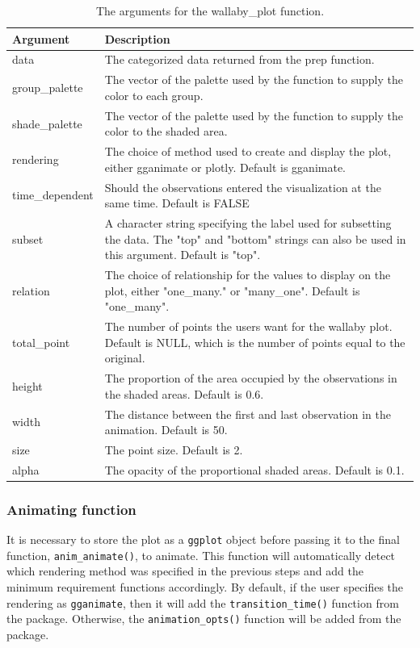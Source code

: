 \begin{table}

\caption{\label{tab:unnamed-chunk-8}The arguments for the wallaby\_plot function.}
\centering
\begin{tabular}[t]{l|>{\raggedright\arraybackslash}p{30em}}
\hline
Argument & Description\\
\hline
data & The categorized data returned from the prep function.\\
\hline
group\_palette & The vector of the palette used by the function to supply the color to each group.\\
\hline
shade\_palette & The vector of the palette used by the function to supply the color to the shaded area.\\
\hline
rendering & The choice of method used to create and display the plot, either gganimate or plotly. Default is gganimate.\\
\hline
time\_dependent & Should the observations entered the visualization at the same time. Default is FALSE\\
\hline
subset & A character string specifying the label used for subsetting the data. The "top" and "bottom" strings can also be used in this argument. Default is "top".\\
\hline
relation & The choice of relationship for the values to display on the plot, either "one\_many." or "many\_one". Default is "one\_many".\\
\hline
total\_point & The number of points the users want for the wallaby plot. Default is NULL, which is the number of points equal to the original.\\
\hline
height & The proportion of the area occupied by the observations in the shaded areas. Default is 0.6.\\
\hline
width & The distance between the first and last observation in the animation. Default is 50.\\
\hline
size & The point size. Default is 2.\\
\hline
alpha & The opacity of the proportional shaded areas. Default is 0.1.\\
\hline
\end{tabular}
\end{table}

\subsubsection{Animating function}\label{animating-function}

It is necessary to store the plot as a \texttt{ggplot} object before passing it to the final function, \texttt{anim\_animate()}, to animate. This function will automatically detect which rendering method was specified in the previous steps and add the minimum requirement functions accordingly. By default, if the user specifies the rendering as \texttt{gganimate}, then it will add the \texttt{transition\_time()} function from the  package. Otherwise, the \texttt{animation\_opts()} function will be added from the  package.

